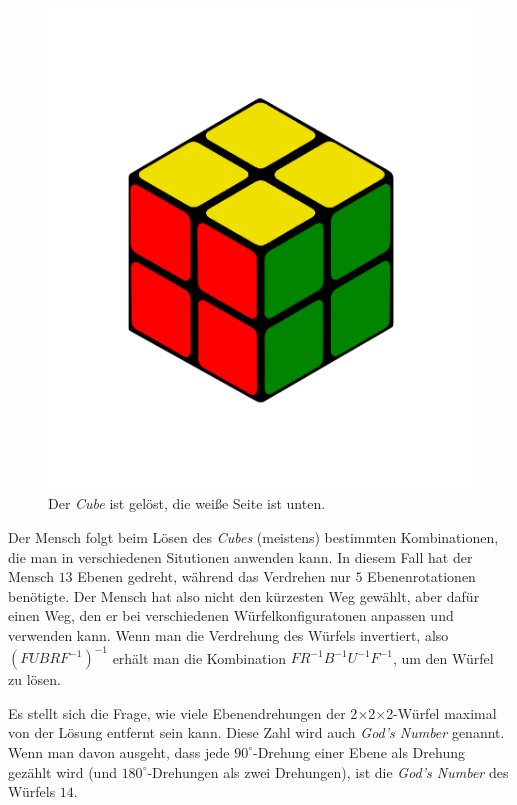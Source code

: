 \documentclass[12pt,a4paper, usenames, dvipsnames]{article}
\newcommand{\Ttwo}{2$\times$2$\times$2-}
\begin{document}
\begin{figure}[H]
\centering
\includegraphics[scale=0.12]{menschSchritt5.png}
\caption[Lösung von Mensch: Schritt 5]{Der \textit{Cube} ist gelöst, die weiße Seite ist unten.}
\label{23}
\end{figure}

Der Mensch folgt beim Lösen des \textit{Cubes} (meistens) bestimmten Kombinationen, die man in verschiedenen Situtionen anwenden kann.  
In diesem Fall hat der Mensch $13$ Ebenen gedreht, während das Verdrehen nur $5$ Ebenenrotationen benötigte. Der Mensch hat also nicht den kürzesten Weg gewählt, aber dafür einen Weg, den er bei verschiedenen Würfelkonfiguratonen anpassen und verwenden kann. 
Wenn man die Verdrehung des Würfels invertiert, also $(FUBRF^{-1})^{-1}$ erhält man die Kombination $FR^{-1}B^{-1}U^{-1}F^{-1}$, um den Würfel zu lösen.


Es stellt sich die Frage, wie viele Ebenendrehungen der \Ttwo Würfel maximal von der Lösung entfernt sein kann. Diese Zahl wird auch \textit{God's Number} genannt. \\
Wenn man davon ausgeht, dass jede $90^\circ$-Drehung einer Ebene als Drehung gezählt wird (und $180^\circ$-Drehungen als zwei Drehungen), ist die \textit{God's Number} des Würfels $14$. \cite{DJ} 
\end{document}
